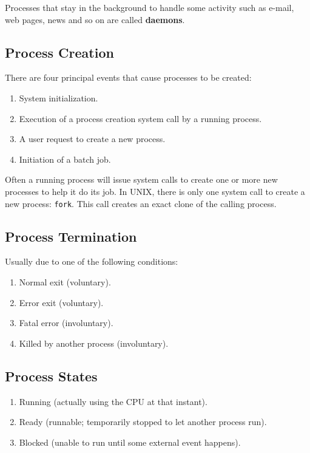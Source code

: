 \documentclass[11pt,a4paper]{article}
\begin{document}
Processes that stay in the background to handle some activity such as e-mail, web pages, news and so on are called \textbf{daemons}.

\subsection{Process Creation}
There are four principal events that cause processes to be created:
\begin{enumerate}
\item{System initialization.}
\item{Execution of a process creation system call by a running process.}
\item{A user request to create a new process.}
\item{Initiation of a batch job.}
\end{enumerate}

Often a running process will issue system calls to create one or more new processes to help it do its job. In UNIX, there is only one system call to create a new process: \texttt{fork}. This call creates an exact clone of the calling process.

\subsection{Process Termination}
Usually due to one of the following conditions:
\begin{enumerate}
\item{Normal exit (voluntary).}
\item{Error exit (voluntary).}
\item{Fatal error (involuntary).}
\item{Killed by another process (involuntary).}
\end{enumerate}

\subsection{Process States}

\begin{enumerate}
\item{Running (actually using the CPU at that instant).}
\item{Ready (runnable; temporarily stopped to let another process run).}
\item{Blocked (unable to run until some external event happens).}
\end{enumerate}
\end{document}
